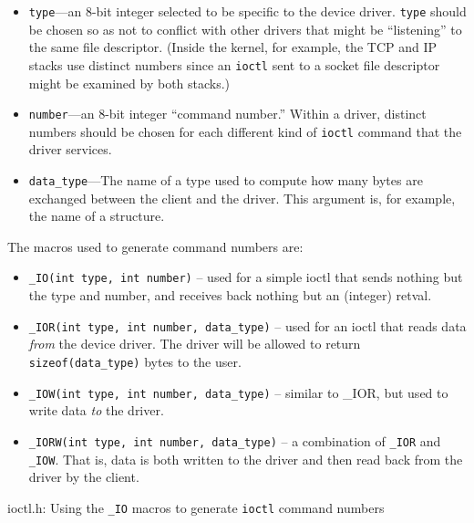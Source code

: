 \documentclass{article}
\begin{document}
\begin{itemize}

\item {\tt type}---an 8-bit integer selected to be specific to the
device driver.  {\tt type} should be chosen so as not to conflict with
other drivers that might be ``listening'' to the same file descriptor.
(Inside the kernel, for example, the TCP and IP stacks use distinct
numbers since an {\tt ioctl} sent to a socket file descriptor might be
examined by both stacks.)

\item {\tt number}---an 8-bit integer ``command number.''  Within a
driver, distinct numbers should be chosen for each different kind of
{\tt ioctl} command that the driver services.

\item {\tt data\_type}---The name of a type used to compute how many
bytes are exchanged between the client and the driver.  This argument
is, for example, the name of a structure.

\end{itemize}

The macros used to generate command numbers are:

\begin{itemize}

\item {\tt \_IO(int type, int number)} -- used for a simple ioctl that
sends nothing but the type and number, and receives back nothing but
an (integer) retval.

\item {\tt \_IOR(int type, int number, data\_type)} -- used for an
ioctl that reads data {\em from} the device driver.  The driver will
be allowed to return {\tt sizeof(data\_type)} bytes to the user.

\item {\tt \_IOW(int type, int number, data\_type)} -- similar to
\_IOR, but used to write data {\em to} the driver.

\item {\tt \_IORW(int type, int number, data\_type)} -- a combination
of {\tt \_IOR} and {\tt \_IOW}.  That is, data is both written to the
driver and then read back from the driver by the client.
\end{itemize}

\begin{Program}
\caption{ioctl.h: Using the {\tt \_IO} macros to generate {\tt ioctl}
command numbers}
\label{ioctl.h}
\end{Program}
\end{document}
